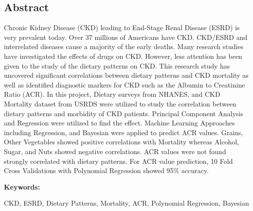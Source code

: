 \begin{center} \section*{Abstract} \end{center}
Chronic Kidney Disease (CKD) leading to End-Stage Renal Disease (ESRD) is very prevalent today. Over 37 millions of Americans have CKD. CKD/ESRD and interrelated diseases cause a majority of the early deaths.  Many research studies have investigated the effects of drugs on CKD. However, less attention has been given to the study of the dietary patterns on CKD. This research study has uncovered significant correlations between dietary patterns and CKD mortality as well as identified diagnostic markers for CKD such as the Albumin to Creatinine Ratio (ACR). In this project, Dietary surveys from NHANES, and CKD Mortality dataset from USRDS were utilized to study the correlation between dietary patterns and morbidity of CKD patients. Principal Component Analysis and Regression were utilized to find the effect. Machine Learning Approaches including Regression, and Bayesian were applied to predict ACR values. Grains, Other Vegetables showed positive correlations with Mortality whereas Alcohol, Sugar, and Nuts showed negative correlations. ACR values were not found strongly correlated with dietary patterns. For ACR value prediction, 10 Fold Cross Validations with Polynomial Regression showed 95\% accuracy.

\medskip
\noindent \textbf{Keywords:} 

\noindent CKD, ESRD, Dietary Patterns, Mortality, ACR, Polynomial Regression, Bayesian